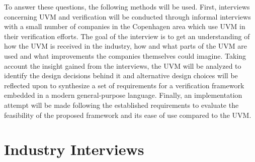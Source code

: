 To answer these questions, the following methods will be used. First, interviews concerning UVM and verification
will be conducted through informal interviews with a small number of companies in the Copenhagen area which use UVM
in their verification efforts. The goal of the interview is to get an understanding of how the UVM is received in the
industry, how and what parts of the UVM are used and what improvements the companies themselves could imagine. Taking
account the insight gained from the interviews, the UVM will be analyzed to identify the design decisions behind it
and alternative design choices will be reflected upon to synthesize a set of requirements for a verification
framework embedded in a modern general-purpose language. Finally, an implementation attempt will be made following
the established requirements to evaluate the feasibility of the proposed framework and its ease of use compared to the UVM.

\chapter{Industry Interviews} %

